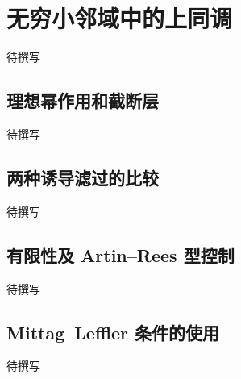 
% 
% 

\section{无穷小邻域中的上同调}
\label{g5:sec:2101}

待撰写

\subsection{理想幂作用和截断层}
\label{g5:subsec:2101:01}
待撰写

\subsection{两种诱导滤过的比较}
\label{g5:subsec:2101:02}
待撰写

\subsection{有限性及 Artin–Rees 型控制}
\label{g5:subsec:2101:03}
待撰写

\subsection{Mittag–Leffler 条件的使用}
\label{g5:subsec:2101:04}
待撰写
